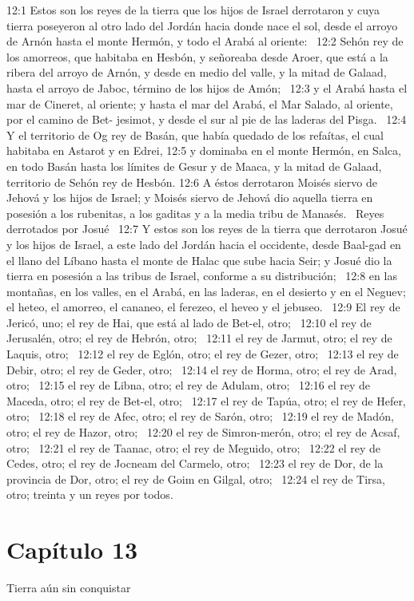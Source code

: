 12:1 Estos son los reyes de la tierra que los hijos de Israel derrotaron y cuya tierra poseyeron al otro lado del Jordán hacia donde nace el sol, desde el arroyo de Arnón hasta el monte Hermón, y todo el Arabá al oriente:  
12:2 Sehón rey de los amorreos, que habitaba en Hesbón, y señoreaba desde Aroer, que está a la ribera del arroyo de Arnón, y desde en medio del valle, y la mitad de Galaad, hasta el arroyo de Jaboc, término de los hijos de Amón;  
12:3 y el Arabá hasta el mar de Cineret, al oriente; y hasta el mar del Arabá, el Mar Salado, al oriente, por el camino de Bet- jesimot, y desde el sur al pie de las laderas del Pisga.  
12:4 Y el territorio de Og rey de Basán, que había quedado de los refaítas, el cual habitaba en Astarot y en Edrei, 
12:5 y dominaba en el monte Hermón, en Salca, en todo Basán hasta los límites de Gesur y de Maaca, y la mitad de Galaad, territorio de Sehón rey de Hesbón. 
12:6 A éstos derrotaron Moisés siervo de Jehová y los hijos de Israel; y Moisés siervo de Jehová dio aquella tierra en posesión a los rubenitas, a los gaditas y a la media tribu de Manasés.  
Reyes derrotados por Josué  
12:7 Y estos son los reyes de la tierra que derrotaron Josué y los hijos de Israel, a este lado del Jordán hacia el occidente, desde Baal-gad en el llano del Líbano hasta el monte de Halac que sube hacia Seir; y Josué dio la tierra en posesión a las tribus de Israel, conforme a su distribución;  
12:8 en las montañas, en los valles, en el Arabá, en las laderas, en el desierto y en el Neguev; el heteo, el amorreo, el cananeo, el ferezeo, el heveo y el jebuseo.  
12:9 El rey de Jericó, uno; el rey de Hai, que está al lado de Bet-el, otro;  
12:10 el rey de Jerusalén, otro; el rey de Hebrón, otro;  
12:11 el rey de Jarmut, otro; el rey de Laquis, otro;  
12:12 el rey de Eglón, otro; el rey de Gezer, otro;  
12:13 el rey de Debir, otro; el rey de Geder, otro;  
12:14 el rey de Horma, otro; el rey de Arad, otro;  
12:15 el rey de Libna, otro; el rey de Adulam, otro;  
12:16 el rey de Maceda, otro; el rey de Bet-el, otro;  
12:17 el rey de Tapúa, otro; el rey de Hefer, otro;  
12:18 el rey de Afec, otro; el rey de Sarón, otro;  
12:19 el rey de Madón, otro; el rey de Hazor, otro;  
12:20 el rey de Simron-merón, otro; el rey de Acsaf, otro;  
12:21 el rey de Taanac, otro; el rey de Meguido, otro;  
12:22 el rey de Cedes, otro; el rey de Jocneam del Carmelo, otro;  
12:23 el rey de Dor, de la provincia de Dor, otro; el rey de Goim en Gilgal, otro;  
12:24 el rey de Tirsa, otro; treinta y un reyes por todos.  
\section*{Capítulo 13}
Tierra aún sin conquistar  


